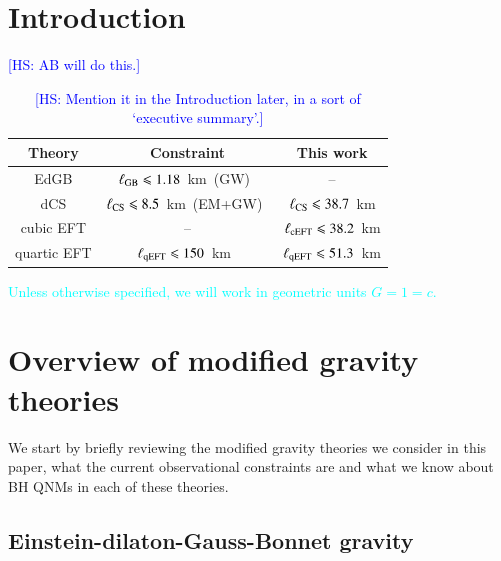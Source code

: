 \documentclass[twocolumn,
               prd,
               aps,
               superscriptaddress,
               tightenlines,
               nofootinbib,
               eqsecnum,
               amsfonts,
               amsmath,
               longbibliography]{revtex4-1}
\newcommand{\hs}[1]{{\textcolor{blue}{{[HS: #1]}} }}
\newcommand{\ab}[1]{{\textcolor{cyan}{{#1}} }}
\begin{document}
\maketitle

\section{Introduction}
\label{sec:intro}

\hs{AB will do this.}

\begin{table}[th]
\begin{tabular}{c | c c}
\hline \hline
Theory & Constraint & This work \\
\hline
EdGB        & $\ell_{\rm GB} \leqslant 1.18$~km~(GW)~\cite{Lyu:2022gdr} & -- \\
dCS         & $\ell_{\rm CS} \leqslant 8.5$~km~(EM+GW)~\cite{Silva:2020acr}  & $\ell_{\rm CS} \leqslant 38.7$~km \\
cubic EFT   & -- & $\ell_{\rm cEFT} \leqslant 38.2$~km \\
quartic EFT & $\ell_{\rm qEFT} \leqslant 150$~km~\cite{Sennett:2019bpc}  & $\ell_{\rm qEFT} \leqslant 51.3$~km \\
\hline \hline
\end{tabular}
\caption{\hs{Mention it in the Introduction later, in a sort of `executive summary'.}}
\label{tab:bound_summary}
\end{table}

\ab{Unless otherwise specified, we will work in geometric units $G = 1 = c$.}

\section{Overview of modified gravity theories}
\label{sec:review_theories}

We start by briefly reviewing the modified gravity theories we consider in this
paper, what the current observational constraints are and what we know
about BH QNMs in each of these theories.

\subsection{Einstein-dilaton-Gauss-Bonnet gravity}
\label{sec:review_edgb}
\end{document}
